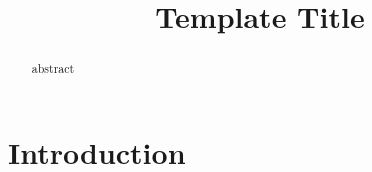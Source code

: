 \documentclass[11pt]{article}
\author{}
\title{Template Title}
\begin{document}
\maketitle

\begin{abstract}
    abstract
\end{abstract}

\section{Introduction}




\end{document}

